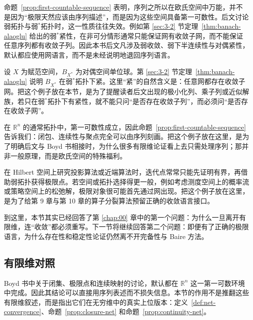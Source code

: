 \begin{remark}
命题~\ref{prop:first-countable-sequence} 表明，序列之所以在欧氏空间中万能，并不是因为“极限天然应该由序列描述”，而是因为这些空间具备第一可数性。后文讨论弱拓扑与弱$^\ast$拓扑时，这一性质往往失效。例如第 \ref{sec:3-2} 节定理~\ref{thm:banach-alaoglu} 给出的弱$^\ast$紧性，在非可分情形通常只能保证网有收敛子网，而不能保证任意序列都有收敛子列。因此本书后文凡涉及弱收敛、弱下半连续性与对偶紧性，默认都应使用网语言，而不是未经说明地退回序列语言。
\end{remark}

\begin{example}\label{ex:weak-star-net}
设 $X$ 为赋范空间，$B_{X^\ast}$ 为对偶空间单位球。第 \ref{sec:3-2} 节定理~\ref{thm:banach-alaoglu} 说明 $B_{X^\ast}$ 在弱$^\ast$拓扑下紧。这里“紧”的自然含义是：任意网都存在收敛子网。把这个例子放在本节，是为了提醒读者后文出现的极小化列、乘子列或近似解族，若只在弱$^\ast$拓扑下有紧性，就不能只问“是否存在收敛子列”，而必须问“是否存在收敛子网”。
\end{example}

\begin{example}\label{ex:euclidean-net}
在 $\mathbb R^n$ 的通常拓扑中，第一可数性成立，因此命题~\ref{prop:first-countable-sequence} 告诉我们：闭包、连续性与聚点完全可以由序列刻画。把这个例子放在这里，是为了明确后文与 Boyd 书相接时，为什么很多有限维论证看上去只需处理序列；那并非一般原理，而是欧氏空间的特殊福利。
\end{example}

\begin{example}\label{ex:function-space-iteration}
在 Hilbert 空间上研究投影算法或近端算法时，迭代点常常只能先证明有界，再借助弱拓扑获得极限点。若空间或拓扑选择得更一般，例如考虑测度空间上的概率流或策略空间上的松弛解，极限对象很可能首先通过网出现。把这个例子放在这里，是为了给第 9 章与第 10 章的算子分裂算法预留正确的收敛语言接口。
\end{example}

到这里，本节其实已经回答了第 \ref{chap:00} 章中的第一个问题：为什么一旦离开有限维，连“收敛”都必须重写。下一节将继续回答第二个问题：即便有了正确的极限语言，为什么存在性和稳定性论证仍然离不开完备性与 Baire 方法。

\subsection*{有限维对照}

Boyd 书中关于闭集、极限点和连续映射的讨论，默认都在 $\mathbb R^n$ 这一第一可数环境中完成。因此其结论可以直接用序列表述而不损失信息。本节的作用不是推翻这些有限维叙述，而是指出它们在无穷维中的真实上位版本：定义~\ref{def:net-convergence}、命题~\ref{prop:closure-net} 和命题~\ref{prop:continuity-net}。

